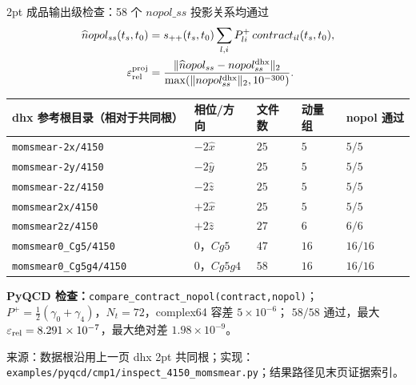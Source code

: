 \documentclass[UTF8,aspectratio=169,11pt]{ctexbeamer}
\newcommand{\source}[1]{\vspace{0.05em}\par{\raggedright\scriptsize\color{muted}来源：#1\par}}
\newcommand{\codepath}[1]{\nolinkurl{#1}}
\begin{document}
\begin{frame}[t]{2pt 成品输出级检查：58 个 $nopol\_ss$ 投影关系均通过}
  \footnotesize
  \begin{align*}
    \widehat nopol_{ss}(t_s,t_0)&=s_{++}(t_s,t_0)
      \sum_{l,i}P^+_{li}\,contract_{il}(t_s,t_0),\\
    \varepsilon_{\rm rel}^{\rm proj}&=
      \frac{\|\widehat nopol_{ss}-nopol_{ss}^{\rm dhx}\|_2}
      {\max(\|nopol_{ss}^{\rm dhx}\|_2,10^{-300})}.
  \end{align*}
  \begin{tabularx}{0.96\textwidth}{@{}Y P{0.13\textwidth} P{0.10\textwidth} P{0.10\textwidth} P{0.14\textwidth}@{}}
    \toprule
    dhx 参考根目录（相对于共同根） & 相位/方向 & 文件数 & 动量组 & nopol 通过 \\
    \midrule
    \codepath{momsmear-2x/4150} & $-2\hat x$ & $25$ & $5$ & $5/5$ \\
    \codepath{momsmear-2y/4150} & $-2\hat y$ & $25$ & $5$ & $5/5$ \\
    \codepath{momsmear-2z/4150} & $-2\hat z$ & $25$ & $5$ & $5/5$ \\
    \codepath{momsmear2x/4150} & $+2\hat x$ & $25$ & $5$ & $5/5$ \\
    \codepath{momsmear2z/4150} & $+2\hat z$ & $27$ & $6$ & $6/6$ \\
    \codepath{momsmear0_Cg5/4150} & $0$，$Cg5$ & $47$ & $16$ & $16/16$ \\
    \codepath{momsmear0_Cg5g4/4150} & $0$，$Cg5g4$ & $58$ & $16$ & $16/16$ \\
    \bottomrule
  \end{tabularx}
  \par\vspace{0.12em}
  {\scriptsize
  \textbf{PyQCD 检查：}\codepath{compare_contract_nopol(contract,nopol)}；
  $P^+=\frac12(\gamma_0+\gamma_4)$，$N_t=72$，complex64 容差 $5\times10^{-6}$；
  $58/58$ 通过，最大 $\varepsilon_{\rm rel}=8.291\times10^{-7}$，最大绝对差 $1.98\times10^{-9}$。\par}
  \source{数据根沿用上一页 dhx 2pt 共同根；实现：\codepath{examples/pyqcd/cmp1/inspect_4150_momsmear.py}；结果路径见末页证据索引。}
\end{frame}
\end{document}
